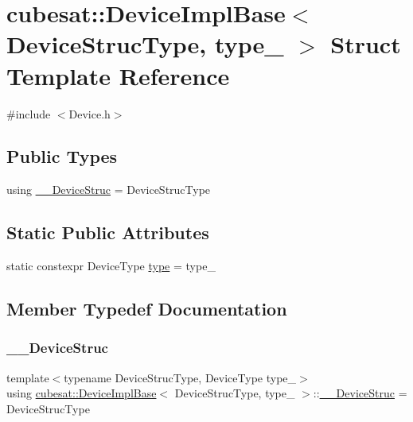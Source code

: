 \hypertarget{structcubesat_1_1DeviceImplBase}{}\section{cubesat\+:\+:Device\+Impl\+Base$<$ Device\+Struc\+Type, type\+\_\+ $>$ Struct Template Reference}
\label{structcubesat_1_1DeviceImplBase}


{\ttfamily \#include $<$Device.\+h$>$}

\subsection*{Public Types}
\begin{DoxyCompactItemize}
\item 
using \hyperlink{structcubesat_1_1DeviceImplBase_a3b5c876c695495c8af41d14d7e15c37d}{\+\_\+\+\_\+\+Device\+Struc} = Device\+Struc\+Type
\end{DoxyCompactItemize}
\subsection*{Static Public Attributes}
\begin{DoxyCompactItemize}
\item 
static constexpr Device\+Type \hyperlink{structcubesat_1_1DeviceImplBase_a89e98fe7649db65d02679b06aa84d7c9}{type} = type\+\_\+
\end{DoxyCompactItemize}


\subsection{Member Typedef Documentation}
\mbox{\label{structcubesat_1_1DeviceImplBase_a3b5c876c695495c8af41d14d7e15c37d}} 
\subsubsection{\texorpdfstring{\+\_\+\+\_\+\+Device\+Struc}{\_\_DeviceStruc}}
{\footnotesize\ttfamily template$<$typename Device\+Struc\+Type, Device\+Type type\+\_\+$>$ \\
using \hyperlink{structcubesat_1_1DeviceImplBase}{cubesat\+::\+Device\+Impl\+Base}$<$ Device\+Struc\+Type, type\+\_\+ $>$\+::\hyperlink{structcubesat_1_1DeviceImplBase_a3b5c876c695495c8af41d14d7e15c37d}{\+\_\+\+\_\+\+Device\+Struc} =  Device\+Struc\+Type}



